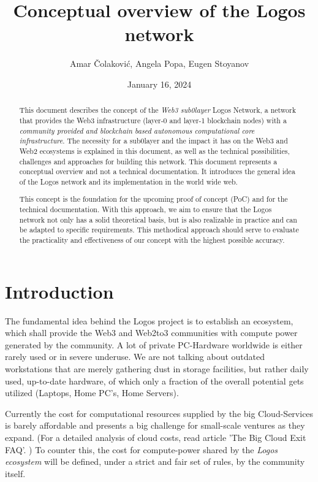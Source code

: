 \documentclass[]{article}
\title{Conceptual overview of the Logos network}
\author{Amar Čolaković, Angela Popa, Eugen Stoyanov}
\affil{LogosLabs}
\date{January 16, 2024}
\begin{document}
\maketitle

\begin{abstract}
This document describes the concept of the \textit{Web3 sub0layer} Logos Network, a network that provides the Web3 infrastructure (layer-0 and layer-1 blockchain nodes) with a \textit{community provided and blockchain based autonomous computational core infrastructure}.
The necessity for a sub0layer and the impact it has on the Web3 and Web2 ecosystems is explained in this document, as well as the technical possibilities, challenges and approaches for building this network.   
This document represents a conceptual overview and not a technical documentation. It introduces the general idea of the Logos network and its implementation in the world wide web.

This concept is the foundation for the upcoming proof of concept (PoC) and for the technical documentation. 
With this approach, we aim to ensure that the Logos network not only has a solid theoretical basis, but is also realizable in practice and can be adapted to specific requirements.
This methodical approach should serve to evaluate the practicality and effectiveness of our concept with the highest possible accuracy.    
\end{abstract}

\tableofcontents
\newpage

\section{Introduction}
The fundamental idea behind the Logos project is to establish an ecosystem, which shall provide the Web3 and Web2to3 communities with compute power generated by the community.
A lot of private PC-Hardware worldwide is either rarely used or in severe underuse. 
We are not talking about outdated workstations that are merely gathering dust in storage facilities, but rather daily used, up-to-date hardware, of which only a fraction of the overall potential gets utilized (Laptops, Home PC’s, Home Servers).

Currently the cost for computational resources supplied by the big Cloud-Services is barely affordable and presents a big challenge for small-scale ventures as they expand. (For a detailed analysis of cloud costs, read article 'The Big Cloud Exit FAQ'. \cite{david-hainemeier-hansson})
To counter this, the cost for compute-power shared by the \textit{Logos ecosystem} will be defined, under a strict and fair set of rules, by the community itself.
\end{document}
